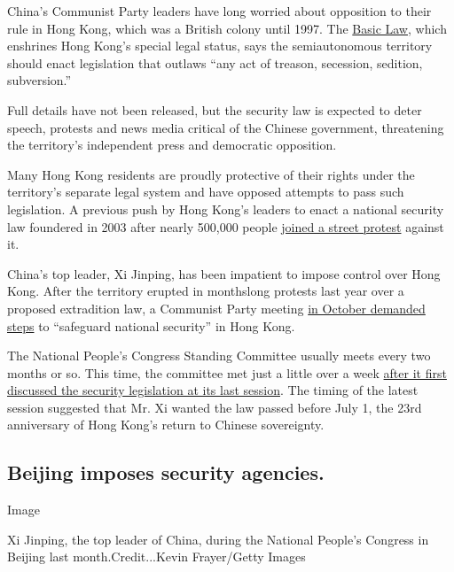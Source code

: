 China's Communist Party leaders have long worried about opposition to
their rule in Hong Kong, which was a British colony until 1997. The
\href{https://www.basiclaw.gov.hk/en/basiclawtext/images/basiclaw_full_text_en.pdf}{Basic
Law}, which enshrines Hong Kong's special legal status, says the
semiautonomous territory should enact legislation that outlaws ``any act
of treason, secession, sedition, subversion.''

Full details have not been released, but the security law is expected to
deter speech, protests and news media critical of the Chinese
government, threatening the territory's independent press and democratic
opposition.

Many Hong Kong residents are proudly protective of their rights under
the territory's separate legal system and have opposed attempts to pass
such legislation. A previous push by Hong Kong's leaders to enact a
national security law foundered in 2003 after nearly 500,000 people
\href{https://www.nytimes3xbfgragh.onion/2003/07/02/world/security-laws-target-of-huge-hong-kong-protest.html}{joined
a street protest} against it.

China's top leader, Xi Jinping, has been impatient to impose control
over Hong Kong. After the territory erupted in monthslong protests last
year over a proposed extradition law, a Communist Party meeting
\href{https://www.nytimes3xbfgragh.onion/2019/10/31/world/asia/hong-kong-protests-china.html}{in
October demanded steps} to ``safeguard national security'' in Hong Kong.

The National People's Congress Standing Committee usually meets every
two months or so. This time, the committee met just a little over a week
\href{http://www.xinhuanet.com/english/2020-06/20/c_139153887.htm}{after
it first discussed the security legislation at its last session}. The
timing of the latest session suggested that Mr. Xi wanted the law passed
before July 1, the 23rd anniversary of Hong Kong's return to Chinese
sovereignty.

\hypertarget{beijing-imposes-security-agencies}{%
\subsection{Beijing imposes security
agencies.}\label{beijing-imposes-security-agencies}}

Image

Xi Jinping, the top leader of China, during the National People's
Congress in Beijing last month.Credit...Kevin Frayer/Getty Images

